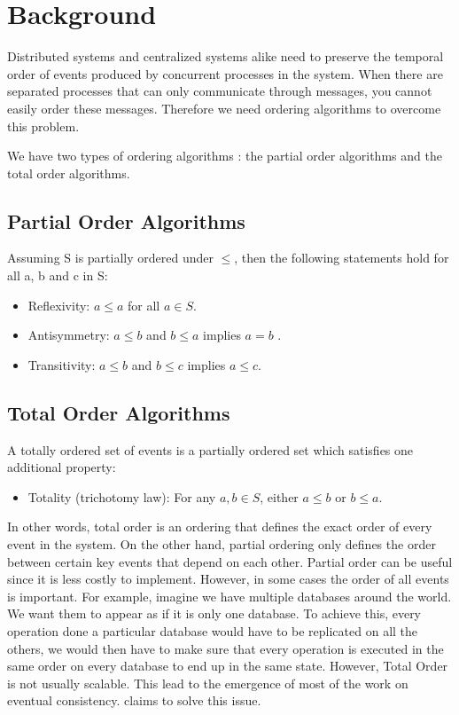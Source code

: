\section{Background}
\label{sec:background}
Distributed systems and centralized systems alike need to preserve the temporal order of events produced by concurrent processes in the system. When there are separated processes that can only communicate through messages, you cannot easily order these messages.
Therefore we need ordering algorithms to overcome this problem.
\par
We have two types of ordering algorithms \autocite{lamport1978time}: the partial order algorithms and the total order algorithms.
\subsection{Partial Order Algorithms}
Assuming S is partially ordered under $\leq$, then the following statements hold for all a, b and c in S:
\begin{itemize}
	\item Reflexivity: $a \leq a$ for all $a \in S$.
	\item Antisymmetry: $a \leq b$ and $b \leq a$ implies $a=b$ .
	\item Transitivity: $a \leq b$  and $b \leq c$  implies $a \leq c$.
\end{itemize}

\subsection{Total Order Algorithms}
A totally ordered set of events is a partially ordered set which satisfies one additional property:
\begin{itemize}
	\item Totality (trichotomy law): For any $a, b \in S$, either $a \leq b$  or $b \leq a$.
\end{itemize}
\par
In other words, total order is an ordering that defines the exact order of every event in the system. On the other hand, partial ordering only defines the order between certain key events that depend on each other. Partial order can be useful since it is less costly to implement. However, in some cases the order of all events is important. For example, imagine we have multiple databases around the world. We want them to appear as if it is only one database. To achieve this, every operation done a particular database would have to be replicated on all the others, we would then have to make sure that every operation is executed in the same order on every database to end up in the same state. However, Total Order is not usually scalable. This lead to the emergence of most of the work on eventual consistency. \epto claims to solve this issue.

